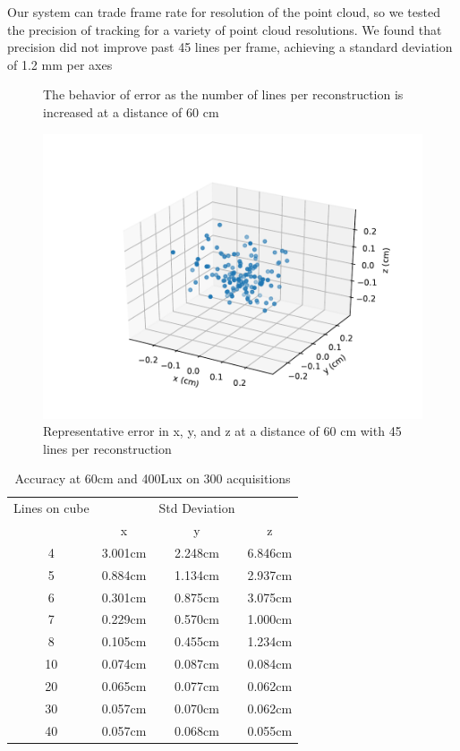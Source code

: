 \documentclass{llncs}
\begin{document}
Our system can trade frame rate for resolution of the point cloud, so we tested the precision of tracking for a variety of point cloud resolutions. We found that precision did not improve past 45 lines per frame, achieving a standard deviation of 1.2 mm per axes
\begin{figure}
\caption{The behavior of error as the number of lines per reconstruction is increased at a distance of 60 cm}
\end{figure}
\begin{figure}
\includegraphics[scale=.7]{45_lines_error}
\caption{Representative error in x, y, and z at a distance of 60 cm with 45 lines per reconstruction}
\end{figure}

\begin{table}
\caption{Accuracy at 60cm and 400Lux on 300 acquisitions}
\begin{tabular}{c|ccc}
\hline
\hline
Lines on cube & & Std Deviation & \\
 & x & y & z\\
\hline
4  & 3.001cm & 2.248cm & 6.846cm\\
5  & 0.884cm & 1.134cm & 2.937cm\\
6  & 0.301cm & 0.875cm & 3.075cm\\
7  & 0.229cm & 0.570cm & 1.000cm\\
8  & 0.105cm & 0.455cm & 1.234cm\\
10 & 0.074cm & 0.087cm & 0.084cm\\
20 & 0.065cm & 0.077cm & 0.062cm\\
30 & 0.057cm & 0.070cm & 0.062cm\\
40 & 0.057cm & 0.068cm & 0.055cm\\
\hline

\end{tabular}
\centering
\end{table}
\end{document}
